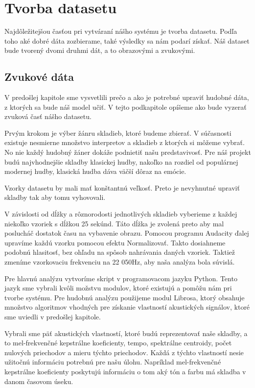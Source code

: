 
\chapter{Tvorba datasetu}
\label{tvorba_datasetu}

Najdôležitejšou časťou pri vytváraní nášho systému je tvorba datasetu.
Podľa toho aké dobré dáta zozbierame, také výsledky sa nám podarí získať.
Náš dataset bude tvorený dvomi druhmi dát, a to obrazovými a zvukovými.

\section{Zvukové dáta}
V predošlej kapitole sme vysvetlili prečo a ako je potrebné upraviť hudobné dáta, z ktorých sa bude náš model učiť.
V tejto podkapitole opíšeme ako bude vyzerať zvuková časť nášho datasetu.

Prvým krokom je výber žánru skladieb, ktoré budeme zbierať.
V súčasnosti existuje nesmierne množstvo interpretov a skladieb z ktorých si môžeme vybrať.
No nie každý hudobný žáner dokáže podnietiť našu predstavivosť.
Pre náš projekt budú najvhodnejšie skladby klasickej hudby, nakoľko na rozdiel od populárnej modernej hudby, klasická hudba dáva väčší dôraz na emócie.

Vzorky datasetu by mali mať konštantnú veľkosť.
Preto je nevyhnutné upraviť skladby tak aby tomu vyhovovali.

V závislosti od dĺžky a rôznorodosti jednotlivých skladieb vyberieme z každej niekoľko vzoriek s dĺžkou 25 sekúnd.
Táto dĺžka je zvolená preto aby mal poslucháč dostatok času na vybavenie obrazu.
Pomocou programu Audacity ďalej upravíme každú vzorku pomocou efektu Normalizovať.
Takto dosiahneme podobnú hlasitosť, bez ohľadu na spôsob nahrávania daných vzoriek.
Taktiež zmeníme vzorkovaciu frekvenciu na 22 050Hz, aby naša analýza bola súvislá.

Pre hlavnú analýzu vytvoríme skript v programovacom jazyku Python.
Tento jazyk sme vybrali kvôli možstvu modulov, ktoré existujú a pomôžu nám pri tvorbe systému.
Pre hudobnú analýzu použijeme modul Librosa, ktorý obsahuje množstvo algoritmov vhodných pre získanie vlastností akustických signálov, ktoré sme uviedli v predošlej kapitole.

Vybrali sme päť akustických vlastností, ktoré budú reprezentovať naše skladby, a to mel-frekvenčné kepstrálne koeficienty, tempo, spektrálne centroidy, počet nulových priechodov a mieru týchto priechodov.
Každá z týchto vlastností nesie užitočnú informáciu potrebnú pre našu úlohu.
Napríklad mel-frekvenčné kepstrálne koeficienty poskytujú informáciu o tom aký tón a farbu má skladba v danom časovom úseku.


